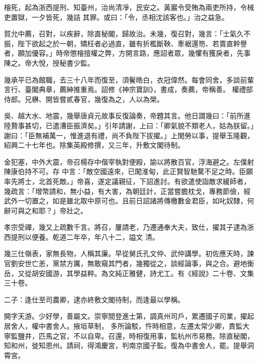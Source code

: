 \begin{pinyinscope}
 檜死，起為浙西提刑、知臺州，治尚清凈，民安之。黃巖令受賄為兩吏所持，令械吏置獄，一夕皆死，幾詰
 其罪。或曰：「令，丞相沈該客也。」治之益急。



 賀允中薦，召對，以疾辭，除直秘閣，歸故治。未幾，復召對，幾言：「士氣久不振，陛下欲起之於一朝，矯枉者必過直，雖有折檻斷鞅、牽裾還笏、若賣直幹譽者，願加優容。」時帝懲檜擅權之弊，方開言路，應詔者眾，幾懼有獲戾者，先事陳之。帝大悅，授秘書少監。



 幾承平已為館職，去三十八年而復至，須鬢皓白，衣冠偉然。每會同舍，多談前輩言行、臺閣典章，薦紳推重焉。詔修《神宗寶訓》，書成，奏薦，帝稱善。
 權禮部侍郎。兄楙、開皆嘗貳春官，幾復為之，人以為榮。



 吳、越大水、地震，幾舉唐貞元故事反復論奏，帝韙其言。他日謂幾曰：「前所進陸贄事甚切，已遣漕臣振濟矣。」引年請謝，上曰：「卿氣貌不類老人，姑為朕留。」謝曰：「臣無補萬一，惟進退有禮，尚不負陛下拔擢。」上閔勞以事，提舉玉隆觀，紹興二十七年也。除集英殿修撰，又三年，升敷文閣待制。



 金犯塞，中外大震，帝召楊存中偕宰執對便殿，諭以將散百官，浮海避之。左僕射陳康伯持不可。存
 中言：「敵空國遠來，已闖淮甸，此正賢智馳騖不足之時。臣願率先將士，北首死敵。」帝喜，遂定議親征，下詔進討。有欲遣使詣敵求緩師者，幾疏言：「增幣請和，無小益，有大害，為朝廷計，正當嘗膽枕戈，專務節儉，經武外一切置之，如是雖北取中原可也。且前日詔諸將傳檄數金君臣，如叱奴隸，何辭可與之和耶？」帝壯之。



 孝宗受禪，幾又上疏數千言。將召，屢請老，乃遷通奉大夫，致仕，擢其子逮為浙西提刑以便養。乾道二年卒，年八十二，謚文
 清。



 幾三仕嶺表，家無長物，人稱其廉。早從舅氏孔文仲、武仲講學。初佐應天時，諫官劉安世亡恙，黨禁方厲，無敢窺其門者，幾獨從之，談經論事，與之合。避地衡岳，又從胡安國游，其學益粹。為文純正雅健，詩尤工。有《經說》二十卷、文集三十卷。



 二子：逢仕至司農卿，逮亦終敷文閣待制，而逢最以學稱。



 開字天游。少好學，善屬文。崇寧間登進士第，調真州司戶，累遷國子司業，擢起居舍人，權中書舍人。掖垣草制，
 多所論駁，忤時相意，左遷太常少卿，責監大寧監鹽井，匹馬之官，不以自卑。召還，時相復用事，監杭州市易務。除直秘閣，知和州，徙知恩州。請祠，得鴻慶宮，判南京國子監。復為中書舍人，罷。提舉洞霄宮。




\end{pinyinscope}
